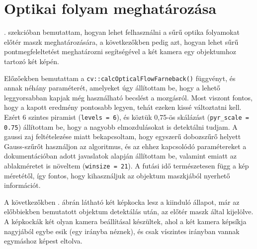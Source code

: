 \section{Optikai folyam meghatározása}

. szekcióban bemutattam, hogyan lehet felhasználni a sűrű optika folyamokat előtér maszk meghatározására, a következőkben pedig azt, hogyan lehet sűrű pontmegfeleltetést meghatározni segítségével a két kamera egy objektumhoz tartozó két képén.

Előzőekben bemutattam a \texttt{cv::calcOpticalFlowFarneback()} függvényt, és annak néhány paraméterét, amelyeket úgy állítottam be, hogy a lehető leggyorsabban kapjak még használható becslést a mozgásról. Most viszont fontos, hogy a kapott eredmény pontosabb legyen, tehát ezeken kissé változtatni kell. Ezért 6 szintes piramist (\texttt{levels = 6}), és köztük 0,75-ös skálázást (\texttt{pyr\_scale = 0.75}) állítottam be, hogy a nagyobb elmozdulásokat is detektálni tudjam. A gaussi zaj feltételezése miatt bekapcsoltam, hogy egyszerű dobozszűrő helyett Gauss-szűrőt használjon az algoritmus, és az ehhez kapcsolódó paramétereket a dokumentációban adott javaslatok alapján állítottam be, valamint emiatt az ablakméretet is növeltem (\texttt{winsize = 21}). A futási idő természetesen függ a kép méretétől, így fontos, hogy kihasználjuk az objektum maszkjából nyerhető információt.

A következőkben . ábrán látható két képkocka lesz a kiinduló állapot, már az előbbiekben bemutatott objektum detektálás után, az előtér maszk által kijelölve. A képkockák két olyan kamera beállításal készültek, ahol a két kamera képsíkja nagyjából egybe esik (egy irányba néznek), és csak víszintes irányban vannak egymáshoz képest eltolva.

